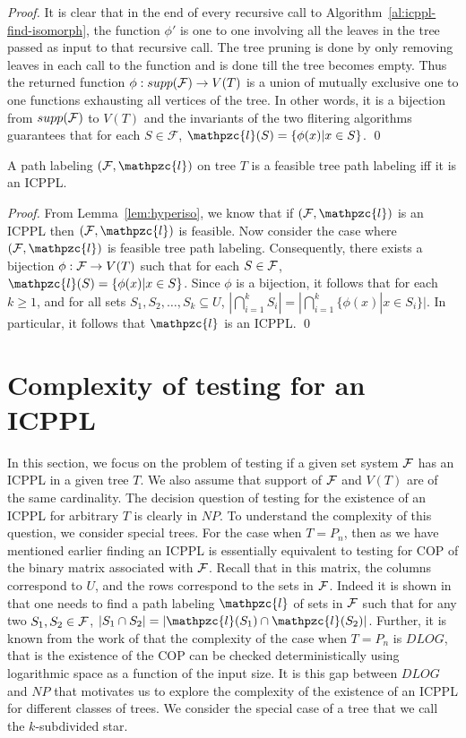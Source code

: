\documentclass[envcountsect, envcountsame, 11pt]{../lib/llncs2e/llncs}
\def\cF{{\cal F}}
\def\F{{\mathcal F}}
\def\cl{\mathpzc{l}}
\begin{document}
\begin{proof}
  It is clear that in the end of every recursive call to
  Algorithm~\ref{al:icppl-find-isomorph}, the function $\phi'$ is one
  to one involving all the leaves in the tree passed as input to that
  recursive call.   The tree pruning is done by only removing
  leaves in each call to the function and is done till the tree
  becomes empty. Thus the returned function $\phi: supp(\cF)
  \rightarrow V(T)$ is a union of mutually exclusive one to one
  functions exhausting all vertices of the tree. In other words, it is
  a bijection from $supp(\cF)$ to $V(T)$ and the invariants of the two flitering
  algorithms guarantees that for each $S \in \F$, $\cl(S) = \{\phi(x) | x \in S\}$.
 \qed
\end{proof}
\begin{theorem}
  \label{th:charac}
  A path labeling $(\cF, \cl)$ on tree $T$ is a feasible tree path labeling iff it is an
  ICPPL.
\end{theorem}
\begin{proof}
  From Lemma~\ref{lem:hyperiso}, we know that if $(\cF, \cl)$ is an
  ICPPL  then $(\cF, \cl)$ is feasible.
  Now consider the case where $(\cF, \cl)$ is feasible tree path labeling.  Consequently, there
  exists a bijection $\phi:\cF \rightarrow V(T)$ such that for each $S \in \cF$, $\cl(S) = \{\phi(x)| x \in S\}$.  
  Since $\phi$ is a bijection, it follows that for each $k \geq 1$, and for all sets $S_1, S_2, \ldots, S_k \subseteq U$, $\displaystyle |\bigcap_{i=1}^k S_i|  =  |\bigcap_{i=1}^k\{\phi(x)| x \in S_i\}|$.  In particular, it follows that $\cl$ is an ICPPL. \qed
\end{proof}
\section{Complexity of  testing for an ICPPL}
\label{sec:ksubdivstar}
In this section, we focus on the problem of testing if a given set system $\cF$ has an ICPPL in a given tree $T$.   We also assume that
support of $\cF$ and $V(T)$ are of the same cardinality.  The decision question of testing for the existence of an ICPPL for arbitrary $T$ is clearly in $NP$.
To understand the complexity of this question, we consider special trees.  For the case when $T=P_n$, then as we have mentioned earlier
finding an ICPPL is essentially equivalent to testing for COP of the binary matrix associated with $\cF$. Recall that in this matrix, the columns correspond to $U$, and the rows correspond to the sets in $\cF$.  Indeed it is shown in \cite{nsnrs09} that one needs to find a path labeling $\cl$ of sets in $\cF$ such that for any two $S_1, S_2 \in \cF$, $|S_1 \cap S_2| = |\cl(S_1) \cap \cl(S_2)|$.    Further, it is known from the work of \cite{kklv10} that the complexity of the case when $T=P_n$ is $DLOG$, that is the existence of the COP can be checked deterministically using logarithmic space as a function of the input size.   It is this gap between $DLOG$ and $NP$ that motivates us to explore the complexity of the existence of an ICPPL for different classes of trees.  We consider the special case of a tree that we call the $k$-subdivided star.
\end{document}
